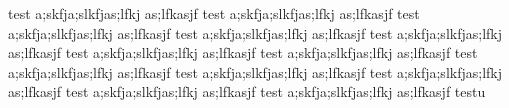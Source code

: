 test a;skfja;slkfjas;lfkj as;lfkasjf
test a;skfja;slkfjas;lfkj as;lfkasjf
test a;skfja;slkfjas;lfkj as;lfkasjf
test a;skfja;slkfjas;lfkj as;lfkasjf test a;skfja;slkfjas;lfkj as;lfkasjf test a;skfja;slkfjas;lfkj as;lfkasjf
test a;skfja;slkfjas;lfkj as;lfkasjf
test a;skfja;slkfjas;lfkj as;lfkasjf
test a;skfja;slkfjas;lfkj as;lfkasjf
test a;skfja;slkfjas;lfkj as;lfkasjf test a;skfja;slkfjas;lfkj as;lfkasjf test a;skfja;slkfjas;lfkj as;lfkasjf
testu
